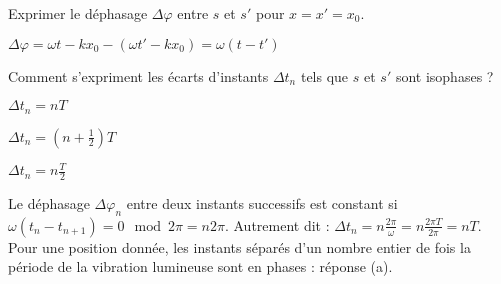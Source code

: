 
\begin{enonce}
	Exprimer le déphasage $\Delta \varphi$ entre $s$ et $s'$ pour $x=x'=x_0$.
	\end{enonce}
	
	
	\begin{corrige}
		$\Delta \varphi = \omega t - k x_0 - \left( \omega t' - k x_0 \right) = \omega \left(t-t'\right)$
	\end{corrige}
	


\begin{enonce}
	Comment s'expriment les écarts d'instants $\Delta t_n$ tels que $s$ et $s'$ sont isophases ? 
	\begin{listeQCM3Colonnes}
	\item $\Delta t_n = n T$
	\item $\Delta t_n = \left(n+\frac{1}{2}\right) T$
	\item $\Delta t_n = n \frac{T}{2}$
	\end{listeQCM3Colonnes}
	\smallskip
\end{enonce}

\reponse{\reponseA{}}

\begin{corrige}
	Le déphasage $\Delta \varphi_n$ entre deux instants successifs est constant si $\omega \left(t_n-t_{n+1}\right)= 0 \mod 2\pi = n 2\pi$. Autrement dit : $\Delta t_n = n\frac{2\pi}{\omega}= n\frac{2\pi T}{2\pi}= n T$. Pour une position donnée, les instants séparés d'un nombre entier de fois la période de la vibration lumineuse sont en phases : réponse (a).
\end{corrige}


\finEntrainement






